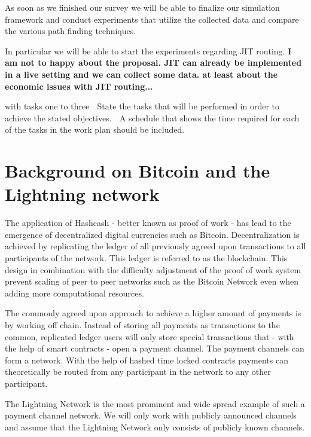 \documentclass[a4paper]{paper}
\begin{document}
As soon as we finished our survey we will be able to finalize our simulation framework and conduct experiments that utilize the collected data and compare the various path finding techniques.

In particular we will be able to start the experiments regarding JIT routing. \textbf{I am not to happy about the proposal. JIT can already be implemented in a live setting and we can collect some data. at least about the economic issues with JIT routing...}

with tasks one to three
 State the tasks that will be performed in order to achieve the stated objectives.
 A schedule that shows the time required for each of the tasks in the work plan should be
included.




\appendix
\section{Background on Bitcoin and the Lightning network}
The application of Hashcash \cite{back2002hashcash} - better known as proof of work -  has lead to the emergence of decentralized digital currencies such as Bitcoin\cite{nakamoto2008bitcoin}.
Decentralization is achieved by replicating the ledger of all previously agreed upon transactions to all participants of the network.
This ledger is referred to as the blockchain.
This design in combination with the difficulty adjustment of the proof of work system prevent scaling of peer to peer networks such as the Bitcoin Network even when adding more computational resources.

The commonly agreed upon approach to achieve a higher amount of payments is by working off chain.
Instead of storing all payments as transactions to the common, replicated ledger users will only store special transactions that - with the help of smart contracts - open a payment channel.
The payment channels can form a network.
With the help of hashed time locked contracts payments can theoretically be routed from any participant in the network to any other participant. 

The Lightning Network is the most prominent and wide spread example of such a payment channel network.
We will only work with publicly announced channels and assume that the Lightning Network only consists of publicly known channels.
\end{document}
